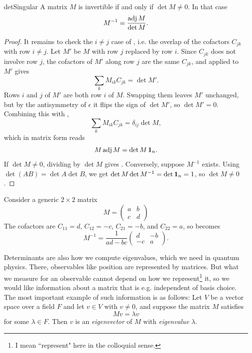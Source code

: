 \begin{proposition}{}{detSingular}
A matrix $M$ is invertible if and only if $\det M\neq0$. In that case
\begin{equation}\label{eq:inverseAdjugate}
  M^{-1}=\frac{\operatorname{adj} M}{\det M}.
\end{equation}
\begin{proof}
It remains to check the $i\neq j$ case of , i.e.
the overlap of the cofactors $C_{jk}$ with row $i\neq j$. Let $M'$ be $M$
with row $j$ replaced by row $i$. Since $C_{jk}$ does not involve row $j$, the cofactors of $M'$ along
row $j$ are the same $C_{jk}$, and  applied to
$M'$ gives
$$
  \sum_k M_{ik}C_{jk}=\det M'.
$$
Rows $i$ and $j$ of $M'$ are both row $i$ of $M$. Swapping them leaves $M'$
unchanged, but by the antisymmetry of $\epsilon$ it flips the sign of
$\det M'$, so $\det M'=0$. Combining this with
,
\begin{equation}\label{eq:rowsDotCofactors}
  \sum_k M_{ik}C_{jk}=\delta_{ij}\det M,
\end{equation}
which in matrix form reads
\begin{equation}\label{eq:adjugateIdentity}
  M\operatorname{adj} M=\det M\,{\mathbf 1}_n.
\end{equation}
If $\det M\neq0$, dividing  by $\det M$ gives
.
Conversely, suppose $M^{-1}$ exists. Using $\det(AB)=\det A\det B$, we get
$\det M\det M^{-1}=\det\id_n=1$, so $\det M\neq0$.
\end{proof}
\end{proposition}

\begin{example}{}{}
Consider a generic $2\times2$ matrix
$$
  M=\begin{pmatrix} a & b \\ c & d \end{pmatrix}
$$
The cofactors are $C_{11}=d$, $C_{12}=-c$,
$C_{21}=-b$, and $C_{22}=a$, so  becomes
$$
  M^{-1}
  =\frac{1}{ad-bc}\begin{pmatrix} d & -b \\ -c & a \end{pmatrix}.
$$
\end{example}

Determinants are also how we compute eigenvalues, which we need in quantum
physics.
There, observables like position are represented by
matrices. But what we measure for an observable cannot depend on how we
represent\footnote{I mean ``represent" here in the colloquial sense.} it,
so we would like information about a matrix that is e.g. independent of
basis choice. The most important example of such information is as follows:
Let $V$ be a vector space over a field $F$ and let $v\in V$ with $v\neq0$,
and suppose the matrix $M$ satisfies
\begin{equation}\label{eq:eigen}
Mv = \lambda v
\end{equation}
for some $\lambda\in F$. Then $v$ is an {\it eigenvector} 
of $M$ with {\it eigenvalue} $\lambda$.

